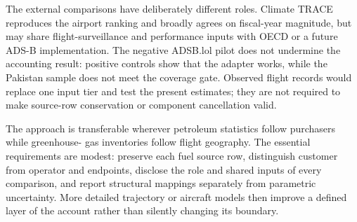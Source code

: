 The external comparisons have deliberately different roles. Climate TRACE reproduces the
airport ranking and broadly agrees on fiscal-year magnitude, but may share flight-surveillance
and performance inputs with OECD or a future ADS-B implementation. The negative ADSB.lol pilot
does not undermine the accounting result: positive controls show that the adapter works, while
the Pakistan sample does not meet the coverage gate. Observed flight records would replace one
input tier and test the present estimates; they are not required to make source-row conservation
or component cancellation valid.

The approach is transferable wherever petroleum statistics follow purchasers while greenhouse-
gas inventories follow flight geography. The essential requirements are modest: preserve each
fuel source row, distinguish customer from operator and endpoints, disclose the role and shared
inputs of every comparison, and report structural mappings separately from parametric
uncertainty. More detailed trajectory or aircraft models then improve a defined layer of the
account rather than silently changing its boundary.
